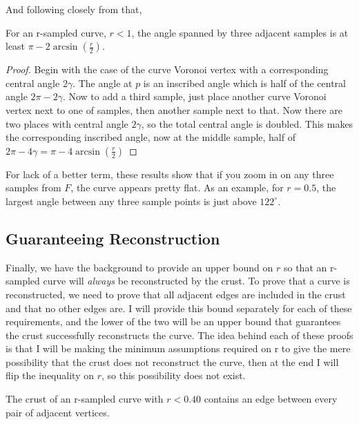 And following closely from that,

\begin{lemma}
	For an r-sampled curve, $r < 1$, the angle spanned by three adjacent samples is at least $\pi - 2\arcsin(\frac{r}{2})$.
	\label{lem:angle_between_samples}
\end{lemma}

\begin{proof}
	Begin with the case of the curve Voronoi vertex with a corresponding central angle $2\gamma$.
	The angle at $p$ is an inscribed angle which is half of the central angle $2\pi - 2\gamma$.
	Now to add a third sample, just place another curve Voronoi vertex next to one of samples, then another sample next to that.
	Now there are two places with central angle $2\gamma$, so the total central angle is doubled.
	This makes the corresponding inscribed angle, now at the middle sample, half of $2\pi - 4\gamma = \pi - 4\arcsin(\frac{r}{2})$
\end{proof}

For lack of a better term, these results show that if you zoom in on any three samples from $F$, the curve appears pretty flat.
As an example, for $r = 0.5$, the largest angle between any three sample points is just above $122^\circ$.

\subsection{Guaranteeing Reconstruction}

Finally, we have the background to provide an upper bound on $r$ so that an r-sampled curve will \textit{always} be reconstructed by the crust.
To prove that a curve is reconstructed, we need to prove that all adjacent edges are included in the crust and that no other edges are.
I will provide this bound separately for each of these requirements, and the lower of the two will be an upper bound that guarantees the crust successfully reconstructs the curve.
The idea behind each of these proofs is that I will be making the minimum assumptions required on r to give the mere possibility that the crust does not reconstruct the curve, then at the end I will flip the inequality on $r$, so this possibility does not exist.

\begin{theorem}
	The crust of an r-sampled curve with $r < 0.40$ contains an edge between every pair of adjacent vertices.
\end{theorem}


